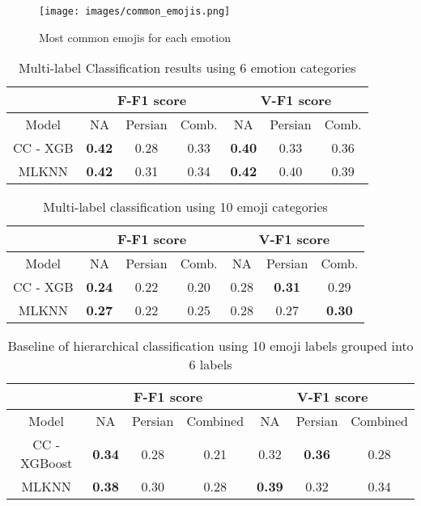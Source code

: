 \documentclass[letterpaper, 10 pt, conference]{ieeeconf}  \usepackage{FG2021}
\begin{document}
\begin{figure}[t]
\centering
\texttt{[image: images/common\_emojis.png]}
\caption{Most common emojis for each emotion}
\label{fig:common-emojis}
\end{figure}


\begin{table}[t]
\caption{Multi-label Classification results using 6 emotion categories}
  \centering
  \begin{tabular}{| c | c  c  c | c  c  c |}
    \hline
       {} &
      \multicolumn{3}{|c|}{F-F1 score} & \multicolumn{3}{|c|}{V-F1 score}  \\ [1ex]
    \hline 
        { Model} & NA & Persian & Comb. & NA & Persian & Comb. 
        \\ [1ex]  \hline
    CC - XGB & \textbf{0.42} & 0.28 & 0.33 & \textbf{0.40} & 0.33 & 0.36
    \\ [1ex] \hline
    MLKNN & \textbf{0.42} & 0.31 & 0.34 & \textbf{0.42} & 0.40 & 0.39
    \\ [1ex] \hline
  \end{tabular}
  
  \label{tab:1}
\end{table}

\begin{table}[t]
\caption{Multi-label classification using 10 emoji categories}
  \centering
  \begin{tabular}{| c | c  c  c | c  c  c |}
    \hline
       {} &
      \multicolumn{3}{|c|}{F-F1 score} & \multicolumn{3}{|c|}{V-F1 score}  \\ [1ex]
    \hline 
        { Model} & NA & Persian & Comb. & NA & Persian & Comb. 
        \\ [1ex]  \hline
    CC - XGB & \textbf{0.24} & 0.22 & 0.20 & 0.28 & \textbf{0.31} & 0.29
    \\ [1ex] \hline
    MLKNN & \textbf{0.27} & 0.22 & 0.25 & 0.28 & 0.27 & \textbf{0.30}
    \\ [1ex] \hline
  \end{tabular}
  
  \label{tab:2}
\end{table}

\begin{table*}[t]
\caption{Baseline of hierarchical classification using 10 emoji labels grouped into 6 labels}
  \centering
  \begin{tabular}{| c | c  c  c | c  c  c |}
    \hline
       {} &
      \multicolumn{3}{|c|}{F-F1 score} & \multicolumn{3}{|c|}{V-F1 score}  \\ [1ex]
    \hline 
        { Model} & NA & Persian & Combined & NA & Persian & Combined 
        \\ [1ex]  \hline
    CC - XGBoost & \textbf{0.34} & 0.28 & 0.21 & 0.32 & \textbf{0.36} & 0.28
    \\ [1ex] \hline
    MLKNN & \textbf{0.38} & 0.30 & 0.28 & \textbf{0.39} & 0.32 & 0.34
    \\ [1ex] \hline
  \end{tabular}
  
  \label{tab:3}
\end{table*}
\end{document}
